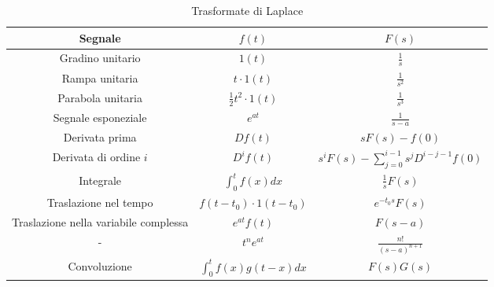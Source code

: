 \begin{table}[!ht]
	\begin{adjustbox}{width=0.8\columnwidth,center}
		\begin{tabular}{|c|c|c|}
			\hline
			Segnale                               & $f(t)$                      & $F(s)$                                           \\
			\hline
			Gradino unitario                      & $1(t)$                      & $\frac{1}{s}$                                    \\
      \hline 
      Rampa unitaria                        & $t \cdot 1(t)$              & $\frac{1}{s^2}$                                  \\
      \hline
      Parabola unitaria                     & $\frac{1}{2}t^2 \cdot 1(t)$            & $\frac{1}{s^3}$                                  \\
			\hline
			Segnale esponeziale                   & $e^{at}$                    & $\frac{1}{s-a}$                                  \\
			\hline
			Derivata prima                        & $Df(t)$                     & $s F(s) - f(0)$                                  \\
			\hline
			Derivata di ordine $i$                & $D^i f(t)$                  & $s^i F(s) - \sum_{j=0}^{i-1} s^j D^{i-j-1} f(0)$ \\
			\hline
			Integrale                             & $\int_0^t f(x) dx$          & $\frac{1}{s} F(s)$                               \\
			\hline
			Traslazione nel tempo                 & $f(t - t_0) \cdot 1(t-t_0)$ & $e^{-t_0 s} F(s)$                                \\
			\hline
			Traslazione nella variabile complessa & $e^{at} f(t)$               & $F(s-a)$                                         \\
			\hline
			-                                     & $t^n e^{at}$                & $\frac{n!}{(s-a)^{n+1}}$                         \\
			\hline
			Convoluzione                          & $\int_0^t f(x)g(t-x)dx$     & $F(s)G(s)$                                       \\
			\hline
		\end{tabular}
	\end{adjustbox}
	\caption{Trasformate di Laplace}
	\label{tab:laplace}
\end{table}

